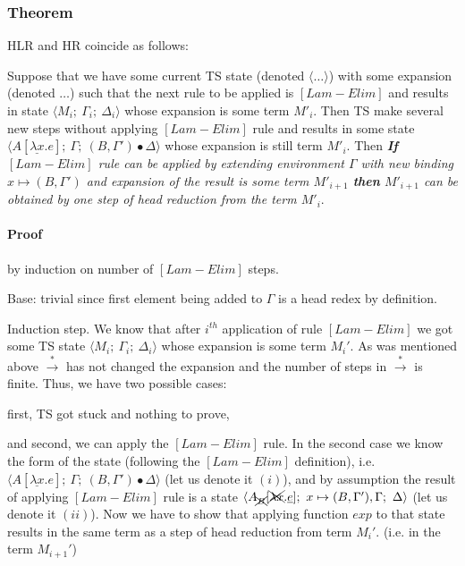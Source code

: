 \documentclass[a4paper, 10pt]{article}
\begin{document}
\subsubsection{Theorem} HLR and HR coincide as follows:

Suppose that we have some current TS state (denoted $\langle \dots \rangle$) with some expansion (denoted $\dots$)
such that the next rule to be applied is $[Lam-Elim]$ and results in state $\langle M_i;\ \Gamma_i;\ \Delta_i \rangle$ whose
expansion is some term $M'_i$. Then TS make several new steps without applying $[Lam-Elim]$ rule and results in some
state $\langle A[\underline{\lambda x}. e];\ \Gamma;\ (B,\Gamma')\bullet\Delta \rangle$ whose expansion is still term
$M'_i$. Then 
\emph{\textbf{If} $[Lam-Elim]$ rule can be applied by extending environment $\Gamma$ with new binding 
  $x \mapsto (B,\Gamma')$ and expansion of the result is some term $M'_{i+1}$
  \textbf{then} $M'_{i+1}$ can be obtained by one step of head reduction from the term $M'_i$}.


\paragraph{Proof} by induction on number of $[Lam-Elim]$ steps.

Base: trivial since first element being added to $\Gamma$ is a head redex by definition.

Induction step. We know that after $i^{th}$ application of rule $[Lam-Elim]$ we got some TS state $\langle M_i;\ \Gamma_i;\ \Delta_i \rangle$ whose expansion is some term $M_i'$. As was mentioned above $\overset{*}{\rightarrow}$ has not changed the expansion and the number of steps in $\overset{*}{\rightarrow}$ is finite. Thus, we have two possible cases:

first, TS got stuck and nothing to prove,

and second, we can apply the $[Lam-Elim]$ rule. In the second case we know the form of the state (following the $[Lam-Elim]$ definition), i.e. $\langle A[\underline{\lambda x}. e];\ \Gamma;\ (B,\Gamma')\bullet\Delta \rangle$ (let us denote it $(i)$), and by assumption the result of applying $[Lam-Elim]$ rule is a state $\langle A_{\xcancel{B}}[\xcancel{\lambda x}.\underline{e}];\ x \mapsto (B,\Gamma'),\Gamma;\ \Delta \rangle$ (let us denote it $(ii)$). Now we have to show that applying function $exp$ to that state results in the same term as a step of head reduction from term $M_i'$. (i.e. in the term $M_{i+1}'$)
\end{document}
